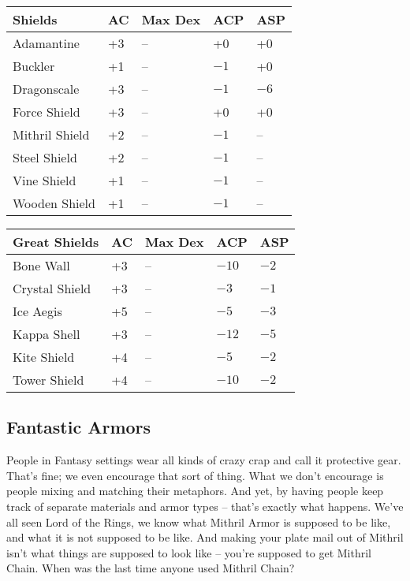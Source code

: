 \begin{multicols}{2}
\begin{small}
\noindent \begin{tabular}{|lllll|}\hline
\parbox[c][12pt]{1pt}{}\textbf{Shields}&AC&Max Dex& ACP&ASP\\\hline
\parbox[c][12pt]{1pt}{}Adamantine&+3&--&+0&+0\\
Buckler&+1&--&$-1$&+0\\
Dragonscale&+3&--&$-1$&$-6$\\
Force Shield&+3&--&+0&+0\\
Mithril Shield&+2&--&$-1$&--\\
Steel Shield&+2&--&$-1$&--\\
Vine Shield&+1&--&$-1$&--\\
Wooden Shield&+1&--&$-1$&--\\\hline
\end{tabular}

\noindent \begin{tabular}{|lllll|}\hline
\parbox[c][12pt]{1pt}{}\textbf{Great Shields}&AC&Max Dex&ACP&ASP\\ \hline
\parbox[c][12pt]{1pt}{}Bone Wall&+3&--&$-10$&$-2$\\
Crystal Shield&+3&--&$-3$&$-1$\\
Ice Aegis&+5&--&$-5$&$-3$\\
Kappa Shell&+3&--&$-12$&$-5$\\
Kite Shield&+4&--&$-5$&$-2$\\
Tower Shield&+4&--&$-10$&$-2$\\\hline
\end{tabular}
\end{small}
\end{multicols}



\subsection{Fantastic Armors}
\vspace*{-8pt}

People in Fantasy settings wear all kinds of crazy crap and call it protective gear. That's fine; we even encourage that sort of thing. What we don't encourage is people mixing and matching their metaphors. And yet, by having people keep track of separate materials and armor types -- that's exactly what happens. We've all seen Lord of the Rings, we know what Mithril Armor is supposed to be like, and what it is not supposed to be like. And making your plate mail out of Mithril isn't what things are supposed to look like -- you're supposed to get Mithril Chain. When was the last time anyone used Mithril Chain?

